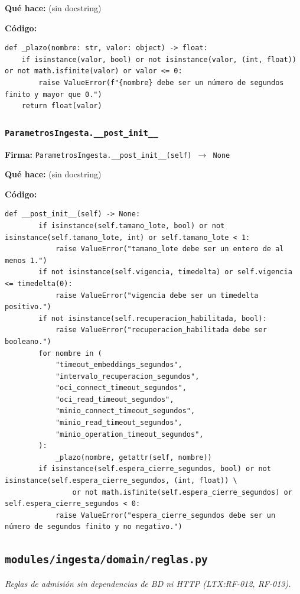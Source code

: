 \documentclass[11pt,a4paper]{article}
\begin{document}
\textbf{Qué hace:} (sin docstring)

\textbf{Código:}
\begin{lstlisting}
def _plazo(nombre: str, valor: object) -> float:
    if isinstance(valor, bool) or not isinstance(valor, (int, float)) or not math.isfinite(valor) or valor <= 0:
        raise ValueError(f"{nombre} debe ser un número de segundos finito y mayor que 0.")
    return float(valor)
\end{lstlisting}

\subsubsection*{\texttt{ParametrosIngesta.\_\_post\_init\_\_}}
\textbf{Firma:} \texttt{ParametrosIngesta.\_\_post\_init\_\_(self) $\rightarrow$ None}

\textbf{Qué hace:} (sin docstring)

\textbf{Código:}
\begin{lstlisting}
def __post_init__(self) -> None:
        if isinstance(self.tamano_lote, bool) or not isinstance(self.tamano_lote, int) or self.tamano_lote < 1:
            raise ValueError("tamano_lote debe ser un entero de al menos 1.")
        if not isinstance(self.vigencia, timedelta) or self.vigencia <= timedelta(0):
            raise ValueError("vigencia debe ser un timedelta positivo.")
        if not isinstance(self.recuperacion_habilitada, bool):
            raise ValueError("recuperacion_habilitada debe ser booleano.")
        for nombre in (
            "timeout_embeddings_segundos",
            "intervalo_recuperacion_segundos",
            "oci_connect_timeout_segundos",
            "oci_read_timeout_segundos",
            "minio_connect_timeout_segundos",
            "minio_read_timeout_segundos",
            "minio_operation_timeout_segundos",
        ):
            _plazo(nombre, getattr(self, nombre))
        if isinstance(self.espera_cierre_segundos, bool) or not isinstance(self.espera_cierre_segundos, (int, float)) \
                or not math.isfinite(self.espera_cierre_segundos) or self.espera_cierre_segundos < 0:
            raise ValueError("espera_cierre_segundos debe ser un número de segundos finito y no negativo.")
\end{lstlisting}

\subsection{\texttt{modules/ingesta/domain/reglas.py}}
\textit{Reglas de admisión sin dependencias de BD ni HTTP (LTX:RF-012, RF-013).}
\end{document}
